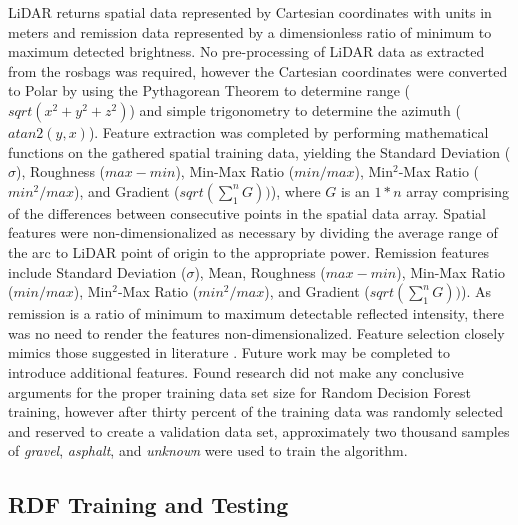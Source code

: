 \documentclass[journal,onecolumn]{IEEEtran}
\begin{document}
			{LiDAR returns spatial data represented by Cartesian coordinates with units in meters and remission data represented by a dimensionless ratio of minimum to maximum detected brightness. No pre-processing of LiDAR data as extracted from the rosbags was required, however the Cartesian coordinates were converted to Polar by using the Pythagorean Theorem to determine range ($sqrt(x^{2} + y^{2} + z^{2})$) and simple trigonometry to determine the azimuth ($atan2(y,x)$). Feature extraction was completed by performing mathematical functions on the gathered spatial training data, yielding the Standard Deviation ($\sigma$), Roughness ($max - min$), Min-Max Ratio ($min / max$), Min$^{2}$-Max Ratio ($min^2 / max$), and Gradient ($sqrt(\sum_{1}^{n} G))$), where $G$ is an $1*n$ array comprising of the differences between consecutive points in the spatial data array. Spatial features were non-dimensionalized as necessary by dividing the average range of the arc to LiDAR point of origin to the appropriate power. Remission features include Standard Deviation ($\sigma$), Mean, Roughness ($max - min$), Min-Max Ratio ($min / max$), Min$^{2}$-Max Ratio ($min^2 / max$), and Gradient ($sqrt(\sum_{1}^{n} G))$). As remission is a ratio of minimum to maximum detectable reflected intensity, there was no need to render the features non-dimensionalized. Feature selection closely mimics those suggested in literature \cite{reymann_improving_2015}. Future work may be completed to introduce additional features. Found research did not make any conclusive arguments for the proper training data set size for Random Decision Forest training, however after thirty percent of the training data was randomly selected and reserved to create a validation data set, approximately two thousand samples of \textit{gravel}, \textit{asphalt}, and \textit{unknown} were used to train the algorithm.} 
	
	
		\subsection{RDF Training and Testing}
		
\end{document}
